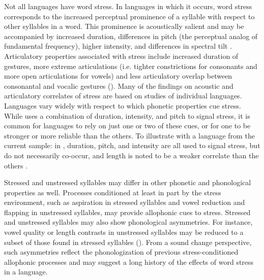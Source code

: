   Not all languages have word stress. In languages in which it occurs, word stress corresponds to the increased perceptual prominence of a syllable with respect to other syllables in a word. This prominence is acoustically salient and may be accompanied by increased duration, differences in pitch (the perceptual analog of fundamental frequency), higher intensity, and differences in spectral tilt \citep{Gordon2011}. Articulatory properties associated with stress include increased duration of gestures, more extreme articulations (i.e. tighter constrictions for consonants and more open articulations for vowels) and less articulatory overlap between consonantal and vocalic gestures (\citealt{BeckmanEdwards1994,Fougeron1999,DeJongEtAl1993}). Many of the findings on acoustic and articulatory correlates of stress are based on studies of individual languages. Languages vary widely with respect to which phonetic properties cue stress. While  uses a combination of duration, intensity, and pitch to signal stress, it is common for languages to rely on just one or two of these cues, or for one to be stronger or more reliable than the others. To illustrate with a language from the current sample: in , duration, pitch, and intensity are all used to signal stress, but do not necessarily co-occur, and length is noted to be a weaker correlate than the others \citep[58]{Lacrampe2014}.

  Stressed and unstressed syllables may differ in other phonetic and phonological properties as well. Processes conditioned at least in part by the stress environment, such as aspiration in stressed syllables and vowel reduction and flapping in unstressed syllables, may provide allophonic cues to stress. Stressed and unstressed syllables may also show phonological asymmetries. For instance, vowel quality or length contrasts in unstressed syllables may be reduced to a subset of those found in stressed syllables (\citealt{vanderHulst2010}). From a sound change perspective, such asymmetries reflect the phonologization of previous stress-conditioned allophonic processes and may suggest a long history of the effects of word stress in a language.

